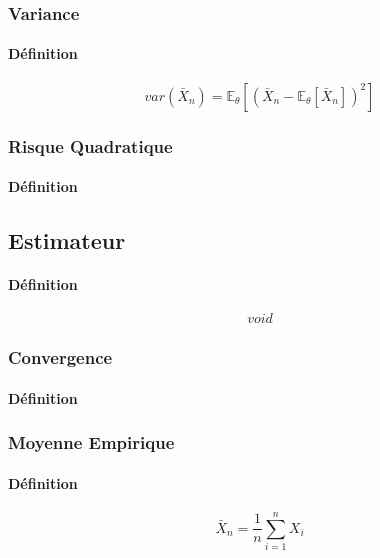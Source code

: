 \documentclass{article}
\begin{document}
\subsubsection{Variance}
\paragraph{Définition}
\begin{equation}
    \boxed{
        var(\bar{X}_{n}) = \mathbb{E}_{\theta}[(\bar{X}_{n} - \mathbb{E}_{\theta}[\bar{X}_{n}])^{2}]
    }
\end{equation}

\subsubsection{Risque Quadratique}
\paragraph{Définition}

\subsection{Estimateur}
\paragraph{Définition}
\begin{equation}
    \boxed{
        void
    }
\end{equation}

\subsubsection{Convergence}
\paragraph{Définition}

\subsubsection{Moyenne Empirique}
\paragraph{Définition}
\begin{equation}
    \boxed{
        \bar{X}_{n} = \frac{1}{n} \sum^{n}_{i=1} X_{i}
    }
\end{equation}
\end{document}
